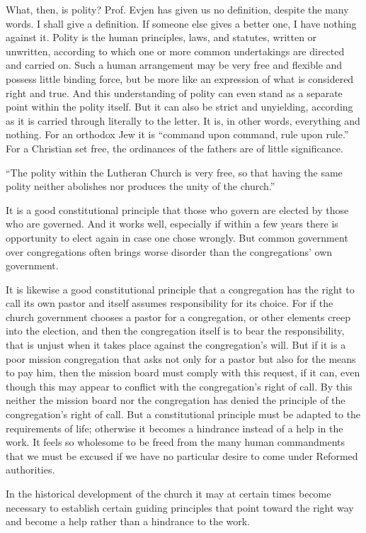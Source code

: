 What, then, is polity? Prof. Evjen has given us no definition, despite the many words. I shall give a definition. If someone else gives a better one, I have nothing against it. Polity is the human principles, laws, and statutes, written or unwritten, according to which one or more common undertakings are directed and carried on. Such a human arrangement may be very free and flexible and possess little binding force, but be more like an expression of what is considered right and true. And this understanding of polity can even stand as a separate point within the polity itself. But it can also be strict and unyielding, according as it is carried through literally to the letter. It is, in other words, everything and nothing. For an orthodox Jew it is “command upon command, rule upon rule.” For a Christian set free, the ordinances of the fathers are of little significance.

“The polity within the Lutheran Church is very free, so that having the same polity neither abolishes nor produces the unity of the church.”

It is a good constitutional principle that those who govern are elected by those who are governed. And it works well, especially if within a few years there is opportunity to elect again in case one chose wrongly. But common government over congregations often brings worse disorder than the congregations’ own government.

It is likewise a good constitutional principle that a congregation has the right to call its own pastor and itself assumes responsibility for its choice. For if the church government chooses a pastor for a congregation, or other elements creep into the election, and then the congregation itself is to bear the responsibility, that is unjust when it takes place against the congregation’s will. But if it is a poor mission congregation that asks not only for a pastor but also for the means to pay him, then the mission board must comply with this request, if it can, even though this may appear to conflict with the congregation’s right of call. By this neither the mission board nor the congregation has denied the principle of the congregation’s right of call. But a constitutional principle must be adapted to the requirements of life; otherwise it becomes a hindrance instead of a help in the work. It feels so wholesome to be freed from the many human commandments that we must be excused if we have no particular desire to come under Reformed authorities.

In the historical development of the church it may at certain times become necessary to establish certain guiding principles that point toward the right way and become a help rather than a hindrance to the work.

